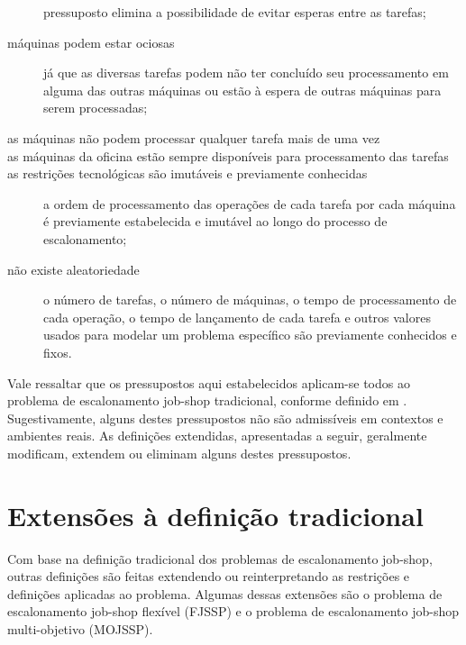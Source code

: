\documentclass[relatorio,nocolorlinks]{inf-ufg}
\begin{document}
\begin{description}
pressuposto elimina a possibilidade de evitar esperas entre as tarefas;
\item[m\'{a}quinas podem estar ociosas] j\'{a} que as diversas tarefas podem n\~{a}o ter conclu\'{i}do seu processamento em alguma das outras
m\'{a}quinas ou est\~{a}o \`{a} espera de outras m\'{a}quinas para serem processadas;
\item[as m\'{a}quinas n\~{a}o podem processar qualquer tarefa mais de uma vez]
\item[as m\'{a}quinas da oficina est\~{a}o sempre dispon\'{i}veis para processamento das tarefas]
\item[as restri\c{c}\~{o}es tecnol\'{o}gicas s\~{a}o imut\'{a}veis e previamente conhecidas] a ordem de processamento das opera\c{c}\~{o}es de
cada tarefa por cada m\'{a}quina \'{e} previamente estabelecida e imut\'{a}vel ao longo do processo de escalonamento;
\item[n\~{a}o existe aleatoriedade] o n\'{u}mero de tarefas, o n\'{u}mero de m\'{a}quinas, o tempo de processamento de cada opera\c{c}\~{a}o, o
tempo de lan\c{c}amento de cada tarefa e outros valores usados para modelar um problema espec\'{i}fico s\~{a}o previamente conhecidos e fixos.
\end{description}

Vale ressaltar que os pressupostos aqui estabelecidos aplicam-se todos ao problema de escalonamento job-shop tradicional, conforme definido em
\cite{French1982}. Sugestivamente, alguns destes pressupostos n\~{a}o s\~{a}o admiss\'{i}veis em contextos e ambientes reais. As defini\c{c}\~{o}es
extendidas, apresentadas a seguir, geralmente modificam, extendem ou eliminam alguns destes pressupostos.

\section{Extens\~{o}es \`{a} defini\c{c}\~{a}o tradicional}

Com base na defini\c{c}\~{a}o tradicional dos problemas de escalonamento job-shop, outras defini\c{c}\~{o}es s\~{a}o feitas extendendo ou
reinterpretando as restri\c{c}\~{o}es e defini\c{c}\~{o}es aplicadas ao problema. Algumas dessas extens\~{o}es s\~{a}o o problema de
escalonamento job-shop flex\'{i}vel (FJSSP) e o problema de escalonamento job-shop multi-objetivo (MOJSSP).
\end{document}
